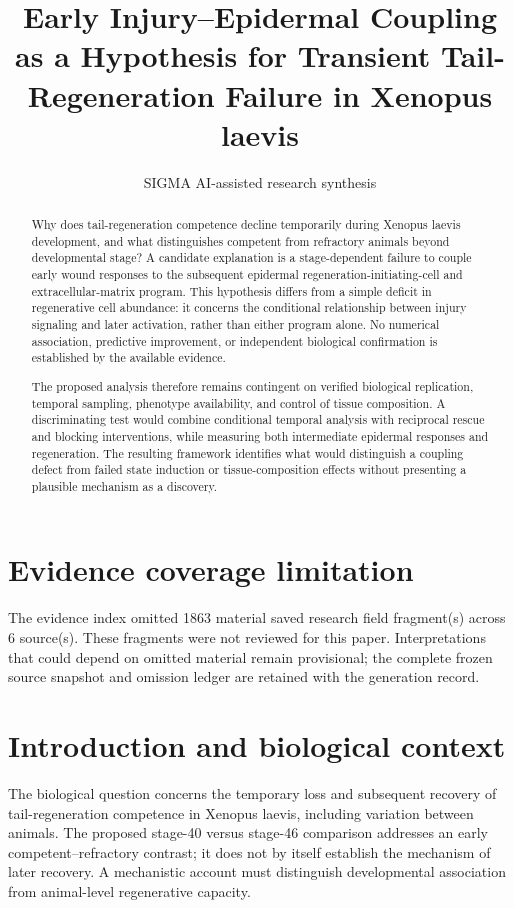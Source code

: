 \documentclass[11pt]{article}
\title{Early Injury–Epidermal Coupling as a Hypothesis for Transient Tail-Regeneration Failure in Xenopus laevis}
\date{}
\author{SIGMA AI-assisted research synthesis}
\begin{document}
\maketitle

\begin{abstract}
Why does tail-regeneration competence decline temporarily during Xenopus laevis development, and what distinguishes competent from refractory animals beyond developmental stage? A candidate explanation is a stage-dependent failure to couple early wound responses to the subsequent epidermal regeneration-initiating-cell and extracellular-matrix program. This hypothesis differs from a simple deficit in regenerative cell abundance: it concerns the conditional relationship between injury signaling and later activation, rather than either program alone. No numerical association, predictive improvement, or independent biological confirmation is established by the available evidence.

The proposed analysis therefore remains contingent on verified biological replication, temporal sampling, phenotype availability, and control of tissue composition. A discriminating test would combine conditional temporal analysis with reciprocal rescue and blocking interventions, while measuring both intermediate epidermal responses and regeneration. The resulting framework identifies what would distinguish a coupling defect from failed state induction or tissue-composition effects without presenting a plausible mechanism as a discovery.
\end{abstract}
\section*{Evidence coverage limitation}
The evidence index omitted 1863 material saved research field fragment(s) across 6 source(s). These fragments were not reviewed for this paper. Interpretations that could depend on omitted material remain provisional; the complete frozen source snapshot and omission ledger are retained with the generation record.
\section{Introduction and biological context}
The biological question concerns the temporary loss and subsequent recovery of tail-regeneration competence in Xenopus laevis, including variation between animals. The proposed stage-40 versus stage-46 comparison addresses an early competent–refractory contrast; it does not by itself establish the mechanism of later recovery. A mechanistic account must distinguish developmental association from animal-level regenerative capacity.
\end{document}
